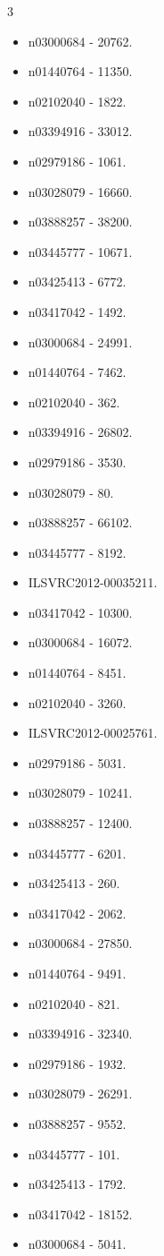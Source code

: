 \begin{multicols}{3}
\begin{itemize}
\item n03000684 - 20762.
\item n01440764 - 11350.
\item n02102040 - 1822.
\item n03394916 - 33012.
\item n02979186 - 1061.
\item n03028079 - 16660.
\item n03888257 - 38200.
\item n03445777 - 10671.
\item n03425413 - 6772.
\item n03417042 - 1492.
\item n03000684 - 24991.
\item n01440764 - 7462.
\item n02102040 - 362.
\item n03394916 - 26802.
\item n02979186 - 3530.
\item n03028079 - 80.
\item n03888257 - 66102.
\item n03445777 - 8192.
\item ILSVRC2012-00035211.
\item n03417042 - 10300.
\item n03000684 - 16072.
\item n01440764 - 8451.
\item n02102040 - 3260.
\item ILSVRC2012-00025761.
\item n02979186 - 5031.
\item n03028079 - 10241.
\item n03888257 - 12400.
\item n03445777 - 6201.
\item n03425413 - 260.
\item n03417042 - 2062.
\item n03000684 - 27850.
\item n01440764 - 9491.
\item n02102040 - 821.
\item n03394916 - 32340.
\item n02979186 - 1932.
\item n03028079 - 26291.
\item n03888257 - 9552.
\item n03445777 - 101.
\item n03425413 - 1792.
\item n03417042 - 18152.
\item n03000684 - 5041.

\end{itemize}
\end{multicols}
